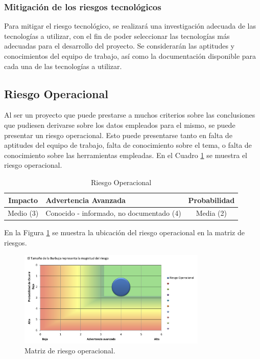 \subsubsection{Mitigación de los riesgos tecnológicos}

Para mitigar el riesgo tecnológico, se realizará una investigación adecuada de
las tecnologías a utilizar, con el fin de poder seleccionar las tecnologías más
adecuadas para el desarrollo del proyecto. Se considerarán las aptitudes y
conocimientos del equipo de trabajo, así como la documentación disponible para
cada una de las tecnologías a utilizar.

\subsection{Riesgo Operacional}

Al ser un proyecto que puede prestarse a muchos criterios sobre las conclusiones
que pudiesen derivarse sobre los datos empleados para el mismo, se puede
presentar un riesgo operacional. Esto puede presentarse tanto en falta de
aptitudes del equipo de trabajo, falta de conocimiento sobre el tema, o falta
de conocimiento sobre las herramientas empleadas. En el Cuadro
\ref{table:riesgo_operacional} se muestra el riesgo operacional.

\begin{table}[H]
\centering
\begin{tabular}{|c|p{5cm}|c|}
\hline
\rowcolor{azulclaro}
  \centering\textbf{Impacto} & \centering\textbf{Advertencia Avanzada}\arraybackslash & \centering\textbf{Probabilidad}\arraybackslash \\
\hline
  Medio (3) & Conocido - informado, no documentado (4) & Media (2) \\
\hline
\end{tabular}
\caption{Riesgo Operacional}
\label{table:riesgo_operacional}
\end{table}

En la Figura \ref{fig:riesgo_operacional} se muestra la ubicación del riesgo
operacional en la matriz de riesgos.

\begin{figure}[H]
  \centering
  \includegraphics[width=0.8\textwidth]{imagenes/03-analisis/analisis-riesgos/riesgo-operacional.png}
  \caption{Matriz de riesgo operacional.}
  \label{fig:riesgo_operacional}
\end{figure}

